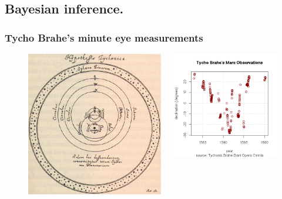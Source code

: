 \subsection{Bayesian inference.}
\begin{frame}
  \frametitle{Tycho Brahe's minute eye measurements}
  \begin{figure}[H]
    \centering
    \begin{columns}
      \begin{column}{0.5\textwidth}
        \includegraphics[width=\fwidth]{../figures/circular-orbits}
      \end{column}
      \begin{column}{0.5\textwidth}
        \includegraphics[width=\fwidth]{../figures/tycho-observations}

\end{column}
\end{columns}
\end{figure}
\end{frame}
